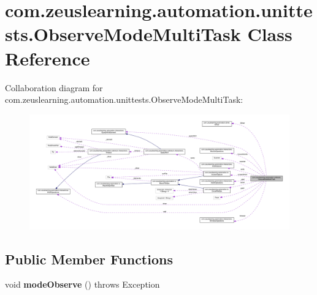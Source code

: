 \hypertarget{classcom_1_1zeuslearning_1_1automation_1_1unittests_1_1ObserveModeMultiTask}{}\section{com.\+zeuslearning.\+automation.\+unittests.\+Observe\+Mode\+Multi\+Task Class Reference}
\label{classcom_1_1zeuslearning_1_1automation_1_1unittests_1_1ObserveModeMultiTask}


Collaboration diagram for com.\+zeuslearning.\+automation.\+unittests.\+Observe\+Mode\+Multi\+Task\+:
\nopagebreak
\begin{figure}[H]
\begin{center}
\leavevmode
\includegraphics[width=350pt]{d5/d3b/classcom_1_1zeuslearning_1_1automation_1_1unittests_1_1ObserveModeMultiTask__coll__graph}
\end{center}
\end{figure}
\subsection*{Public Member Functions}
\begin{DoxyCompactItemize}
\item 
\hypertarget{classcom_1_1zeuslearning_1_1automation_1_1unittests_1_1ObserveModeMultiTask_ace322eb0f55fe7965c4594ea4767cde1}{}\label{classcom_1_1zeuslearning_1_1automation_1_1unittests_1_1ObserveModeMultiTask_ace322eb0f55fe7965c4594ea4767cde1} 
void {\bfseries mode\+Observe} ()  throws Exception 
\end{DoxyCompactItemize}
